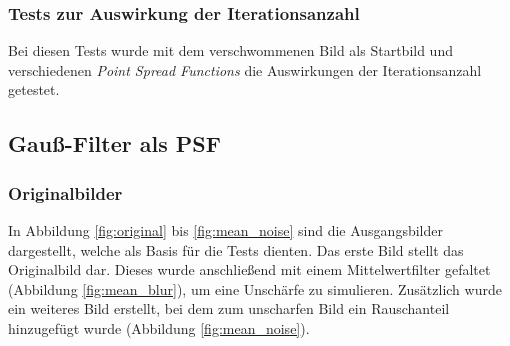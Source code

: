 \subsubsection{Tests zur Auswirkung der Iterationsanzahl}

Bei diesen Tests wurde mit dem verschwommenen Bild als Startbild und verschiedenen \textit{Point Spread Functions} die Auswirkungen der Iterationsanzahl getestet.

\noindent
\begin{minipage}[t]{0.33\textwidth}
\end{minipage}
%
\begin{minipage}[t]{0.33\textwidth}
\end{minipage}
%
\begin{minipage}[t]{0.33\textwidth}
\end{minipage}



\subsection{Gauß-Filter als PSF}

\subsubsection{Originalbilder}

In Abbildung \ref{fig:original} bis \ref{fig:mean_noise} sind die Ausgangsbilder dargestellt, welche als Basis für die Tests dienten. Das erste Bild stellt das Originalbild dar. Dieses wurde anschließend mit einem Mittelwertfilter gefaltet (Abbildung \ref{fig:mean_blur}), um eine Unschärfe zu simulieren. Zusätzlich wurde ein weiteres Bild erstellt, bei dem zum unscharfen Bild ein Rauschanteil hinzugefügt wurde (Abbildung \ref{fig:mean_noise}).

\noindent
\begin{minipage}[t]{0.33\textwidth}
\end{minipage}
%
\begin{minipage}[t]{0.33\textwidth}
\end{minipage}
%
\begin{minipage}[t]{0.33\textwidth}
\end{minipage}


